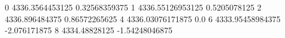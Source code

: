0 4336.3564453125 0.32568359375
1 4336.55126953125 0.5205078125
2 4336.896484375 0.86572265625
4 4336.03076171875 0.0
6 4333.95458984375 -2.076171875
8 4334.48828125 -1.54248046875
